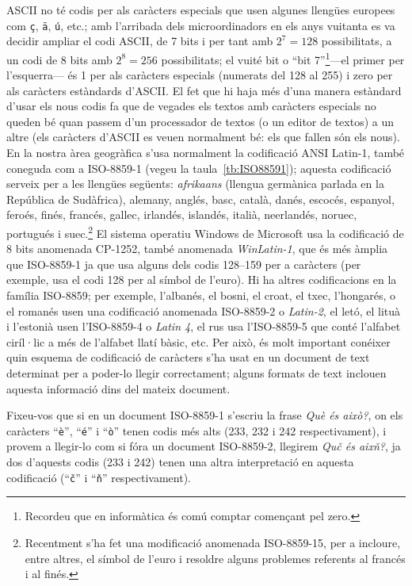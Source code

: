 ASCII no té codis per als caràcters especials que usen algunes
llengües europees com \texttt{ç}, \texttt{ä}, \texttt{ú}, etc.; amb
l'arribada dels microordinadors en els anys vuitanta es va decidir
ampliar el codi ASCII, de 7 bits i per tant amb $2^7=128$
possibilitats, a un codi de 8 bits amb $2^8=256$ possibilitats; el
vuité bit o ``bit 7''\footnote{Recordeu que en informàtica és comú
  comptar començant pel zero.}---el primer per l'esquerra--- és 1 per
als caràcters especials (numerats del 128 al 255) i zero per als
caràcters estàndards d'ASCII.  El fet que hi haja més d'una manera
estàndard d'usar els nous codis fa que de vegades els textos amb
caràcters especials no queden bé quan passem d'un processador de
textos (o un editor de textos) a un altre (els caràcters d'ASCII es
veuen normalment bé: els que fallen són els nous).  En la nostra àrea
geogràfica s'usa normalment la codificació ANSI Latin-1, també
coneguda com a ISO-8859-1 (vegeu la taula~\ref{tb:ISO88591}); aquesta
codificació serveix per a les llengües següents: \emph{afrikaans}
(llengua germànica parlada en la República de Sudàfrica), alemany,
anglés, basc, català, danés, escocés, espanyol, feroés, finés,
francés, gallec, irlandés, islandés, italià, neerlandés, noruec,
portugués i suec.\footnote{Recentment s'ha fet una modificació
  anomenada ISO-8859-15, per a incloure, entre altres, el símbol de
  l'euro i resoldre alguns problemes referents al francés i al finés.}
El sistema operatiu Windows de Microsoft usa la codificació de 8 bits
anomenada CP-1252, també anomenada \emph{WinLatin-1}, que és més
àmplia que ISO-8859-1 ja que usa alguns dels codis 128--159 per a
caràcters (per exemple, usa el codi 128 per al símbol de l'euro). Hi
ha altres codificacions en la família ISO-8859; per exemple,
l'albanés, el bosni, el croat, el txec, l'hongarés, o el romanés usen
una codificació anomenada ISO-8859-2 o \emph{Latin-2}, el letó, el
lituà i l'estonià usen l'ISO-8859-4 o \emph{Latin 4}, el rus usa
l'ISO-8859-5 que conté l'alfabet ciríl·lic a més de l'alfabet llatí
bàsic, etc. Per això, és molt important conéixer quin esquema de
codificació de caràcters s'ha usat en un document de text determinat
per a poder-lo llegir correctament; alguns formats de text inclouen
aquesta informació dins del mateix document.

Fixeu-vos que si en un document ISO-8859-1 s'escriu la frase \emph{Què
  és això?}, on els caràcters ``\texttt{è}'', ``\texttt{é}'' i
``\texttt{ò}'' tenen codis més alts (233, 232 i 242 respectivament), i
provem a llegir-lo com si fóra un document ISO-8859-2, llegirem
\emph{Quč és aixň?}, ja dos d'aquests codis (233 i 242) tenen una
altra interpretació en aquesta codificació (``\texttt{č}'' i
``\texttt{ň}'' respectivament).


